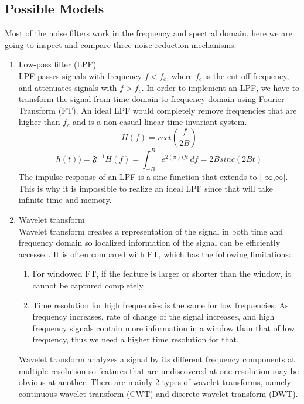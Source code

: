 \subsection{Possible Models}
Most of the noise filters work in the frequency and spectral domain, here we are going to inspect and
compare three noise reduction mechanisms.

\begin{enumerate}
	\item Low-pass filter (LPF)\\
	LPF passes signals with frequency \(f<f_{c}\), where \(f_{c}\) is the cut-off frequency, and attenuates
	signals with \(f>f_{c}\). 
	In order to implement an LPF, we have to transform the signal from time domain to 
	frequency domain using Fourier Transform (FT). An ideal LPF would completely remove frequencies that are
	higher than \(f_{c}\) and is a non-casual linear time-invariant system. 
	\[H(f) = rect(\frac{f}{2B})\]
	\[h(t))= \mathfrak{F}^{-1}{H(f)} = \int_{-B}^{B} e^{2(\pi)ift}\,df = 2Bsinc(2Bt)\]
	The impulse response of an LPF is a sinc function that extends to [-$\infty$,$\infty$]. This is why it is 
	impossible to realize an ideal LPF since that will take infinite time and memory.

	\item Wavelet transform\\
	Wavelet transform creates a representation of the signal in both time and frequency domain so localized 
	information of the signal can be efficiently accessed. It is often compared with FT, which
	has the following limitations: 
	\begin{enumerate}
		\item For windowed FT, if the feature is larger or shorter than the window, it cannot be captured completely.
		\item Time resolution for high frequencies is the same for low frequencies. As frequency increases, rate of 
		change of the signal increases, and high frequency signals contain more information in a window than that of 
		low frequency, thus we need a higher time resolution for that.
	\end{enumerate}
	Wavelet transform analyzes a signal by its different frequency components at multiple resolution so features that are 
	undiscovered at one resolution may be obvious at another. There are mainly 2 types of wavelet transforms, namely 
	continuous wavelet transform (CWT) and discrete wavelet transform (DWT).
	

\end{enumerate}
